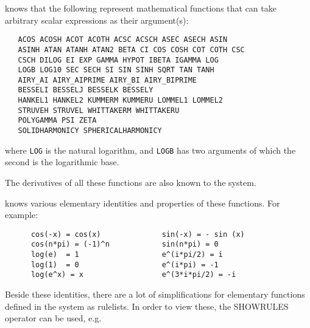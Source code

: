 {\REDUCE} knows that the following represent mathematical functions
 that can
take arbitrary scalar expressions as their argument(s):
\begin{verbatim}
   ACOS ACOSH ACOT ACOTH ACSC ACSCH ASEC ASECH ASIN
   ASINH ATAN ATANH ATAN2 BETA CI COS COSH COT COTH CSC
   CSCH DILOG EI EXP GAMMA HYPOT IBETA IGAMMA LOG
   LOGB LOG10 SEC SECH SI SIN SINH SQRT TAN TANH
   AIRY_AI AIRY_AIPRIME AIRY_BI AIRY_BIPRIME
   BESSELI BESSELJ BESSELK BESSELY
   HANKEL1 HANKEL2 KUMMERM KUMMERU LOMMEL1 LOMMEL2
   STRUVEH STRUVEL WHITTAKERM WHITTAKERU
   POLYGAMMA PSI ZETA
   SOLIDHARMONICY SPHERICALHARMONICY
\end{verbatim}
where \texttt{LOG} is the natural logarithm,
and \texttt{LOGB} has two arguments of which the second is the logarithmic base.

The derivatives of all these functions are also known to the system.

{\REDUCE} knows various elementary identities and properties
of these functions. For example:
\begin{verbatim}
      cos(-x) = cos(x)              sin(-x) = - sin (x)
      cos(n*pi) = (-1)^n            sin(n*pi) = 0
      log(e)  = 1                   e^(i*pi/2) = i
      log(1)  = 0                   e^(i*pi) = -1
      log(e^x) = x                  e^(3*i*pi/2) = -i
\end{verbatim}

Beside these identities, there are a lot of simplifications
for elementary functions
defined in the {\REDUCE} system as rulelists. In order to
view these, the SHOWRULES operator can be used, e.g.

